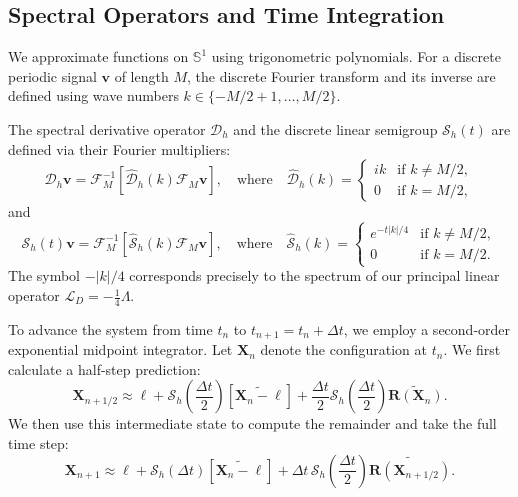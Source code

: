 \documentclass{amsart}
\begin{document}
\subsection{Spectral Operators and Time Integration}

We approximate functions on $\mathbb{S}^1$ using trigonometric polynomials. For a discrete periodic signal $\mathbf{v}$ of length $M$, the discrete Fourier transform and its inverse are defined using wave numbers $k \in \{-M/2 + 1, \dots, M/2\}$. 

The spectral derivative operator $\mathcal{D}_h$ and the discrete linear semigroup $\mathcal{S}_h(t)$ are defined via their Fourier multipliers:
\[
\mathcal{D}_h \mathbf{v} = \mathcal{F}^{-1}_M \left[ \widehat{\mathcal{D}}_h(k) \mathcal{F}_M \mathbf{v} \right], \quad \text{where} \quad \widehat{\mathcal{D}}_h(k) = \left\{ 
\begin{array}{ll}
i k & \text{if } k \neq M/2, \\
0 & \text{if } k = M/2,
\end{array}\right.
\]
and
\[
\mathcal{S}_h(t) \mathbf{v} = \mathcal{F}^{-1}_M \left[ \widehat{\mathcal{S}}_h(k) \mathcal{F}_M \mathbf{v} \right], \quad \text{where} \quad \widehat{\mathcal{S}}_h(k) = \left\{ 
\begin{array}{ll}
e^{-t|k|/4} & \text{if } k \neq M/2, \\
0 & \text{if } k = M/2.
\end{array}\right.
\]
The symbol $-|k|/4$ corresponds precisely to the spectrum of our principal linear operator $\mathcal{L}_D = -\frac{1}{4}\Lambda$.

To advance the system from time $t_n$ to $t_{n+1} = t_n + \Delta t$, we employ a second-order exponential midpoint integrator. Let $\mathbf{X}_n$ denote the configuration at $t_n$. We first calculate a half-step prediction:
\begin{equation}
\mathbf{X}_{n+1/2} \approx \boldsymbol{\ell} + \mathcal{S}_h\left(\frac{\Delta t}{2}\right) \left[ \widetilde{\mathbf{X}_n - \boldsymbol{\ell}} \right] + \frac{\Delta t}{2} \mathcal{S}_h\left(\frac{\Delta t}{2}\right) \widetilde{\mathbf{R}(\mathbf{X}_n)}.
\end{equation}
We then use this intermediate state to compute the remainder and take the full time step:
\begin{equation}
\mathbf{X}_{n+1} \approx \boldsymbol{\ell} + \mathcal{S}_h(\Delta t) \left[ \widetilde{\mathbf{X}_n - \boldsymbol{\ell}} \right] + \Delta t \, \mathcal{S}_h\left(\frac{\Delta t}{2}\right) \widetilde{\mathbf{R}(\mathbf{X}_{n+1/2})}.
\end{equation}
\end{document}
